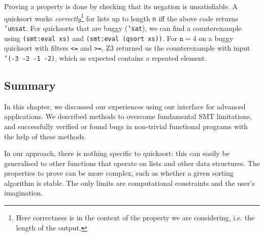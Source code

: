 Proving a property is done by checking that its negation is unsatisfiable. A
quicksort works \textit{correctly}\footnote{Here correctness is in the context
of the property we are considering, i.e. the length of the output.} for lists
up to length \texttt{n} iff the above code returns \texttt{'unsat}. For
quicksorts that are buggy (\texttt{'sat}), we can find a counterexample using
\texttt{(smt:eval xs)} and \texttt{(smt:eval (qsort xs))}. For $\mathtt{n}=4$
on a buggy quicksort with filters \texttt{<=} and \texttt{>=}, Z3 returned us
the counterexample with input \texttt{'(-3 -2 -1 -2)}, which as expected
contains a repeated element.

\subsection*{Summary}

In this chapter, we discussed our experiences using our interface for advanced
applications. We described methods to overcome fundamental SMT limitations,
and successfully verified or found bugs in non-trivial functional programs
with the help of these methods.

In our approach, there is nothing specific to quicksort: this can easily be
generalised to other functions that operate on lists and other data
structures. The properties to prove can be more complex, such as whether a
given sorting algorithm is stable. The only limits are computational
constraints and the user's imagination.
